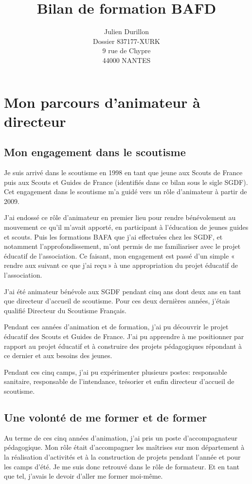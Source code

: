 \documentclass[titlepage,11pt,a4paper]{article}
\title{Bilan de formation BAFD}
\author{Julien Durillon\\Dossier 837177-XURK\\9 rue de Chypre\\44000 NANTES}
\begin{document}
\maketitle


\section{Mon parcours d'animateur à directeur}

\subsection{Mon engagement dans le scoutisme}

Je suis arrivé dans le scoutisme en 1998 en tant que jeune aux Scouts de France puis aux Scouts et Guides
de France (identifiés dans ce bilan sous le sigle SGDF). Cet engagement dans le scoutisme
m'a guidé vers un rôle d'animateur à partir de 2009.

J'ai endossé ce rôle d'animateur en premier lieu pour rendre bénévolement au mouvement ce
qu'il m'avait apporté, en participant à l'éducation de jeunes guides et scouts. Puis les
formations BAFA que j'ai effectuées chez les SGDF, et notamment l'approfondissement, m'ont
permis de me familiariser avec le projet éducatif de l'association. Ce faisant, mon
engagement est passé d'un simple «\,rendre aux suivant ce que j'ai reçu\,» à une
appropriation du projet éducatif de l'association.

J'ai été animateur bénévole aux SGDF pendant cinq ans dont deux ans en tant que directeur
d'accueil de scoutisme. Pour ces deux dernières années, j'étais qualifié Directeur du Scoutisme Français.

Pendant ces années d'animation et de formation, j'ai pu découvrir le projet éducatif des
Scouts et Guides de France. J'ai pu apprendre à me positionner par rapport au projet
éducatif et à construire des projets pédagogiques répondant à ce dernier et aux besoins
des jeunes.

Pendant ces cinq camps, j'ai pu expérimenter plusieurs postes: responsable sanitaire,
responsable de l'intendance, trésorier et enfin directeur d'accueil de scoutisme.

\subsection{Une volonté de me former et de former}

Au terme de ces cinq années d'animation, j'ai pris un poste d'accompagnateur pédagogique.
Mon rôle était d'accompagner les maîtrises sur mon département à la réalisation
d'activités et à la construction de projets pendant l'année et pour les camps d'été.
Je me suis donc retrouvé dans le rôle de formateur. Et en tant que tel, j'avais le
devoir d'aller me former moi-même.
\end{document}
